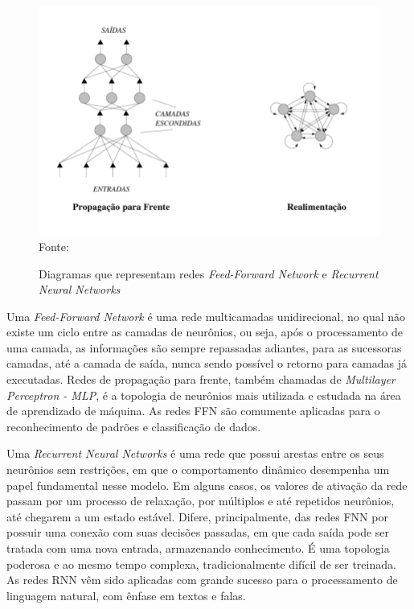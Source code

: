  \begin{figure}[ht!]
\caption{Diagramas que representam redes \textit{Feed-Forward Network} e \textit{Recurrent Neural Networks}}
\label{fig:graphNeuron2}
\centering
\includegraphics[scale=0.5]{img/graphNeuron2.png}
{\fontsize{11pt}{\baselineskip}\selectfont
\\Fonte: \cite{Rauber2005}
}
\end{figure}
 
Uma \textit{Feed-Forward Network} é uma rede multicamadas unidirecional, no qual não existe um ciclo entre as camadas de neurônios, ou seja, após o processamento de uma camada, as informações são sempre repassadas adiantes, para as sucessoras camadas, até a camada de saída, nunca sendo possível o retorno para camadas já executadas. Redes de propagação para frente, também chamadas de \textit{Multilayer Perceptron - MLP}, é a topologia de neurônios mais utilizada e estudada na área de aprendizado de máquina. As redes FFN são comumente aplicadas para o reconhecimento de padrões e classificação de dados.
 
Uma \textit{Recurrent Neural Networks} é uma rede que possui arestas entre os seus neurônios sem restrições, em que o comportamento dinâmico desempenha um papel fundamental nesse modelo. Em alguns casos, os valores de ativação da rede passam por um processo de relaxação, por múltiplos e até repetidos neurônios, até chegarem a um estado estável. Difere, principalmente, das redes FNN por possuir uma conexão com suas decisões passadas, em que cada saída pode ser tratada com uma nova entrada, armazenando conhecimento. É uma topologia poderosa e ao mesmo tempo complexa, tradicionalmente difícil de ser treinada. As redes RNN vêm sido aplicadas com grande sucesso para o processamento de linguagem natural, com ênfase em textos e falas.

